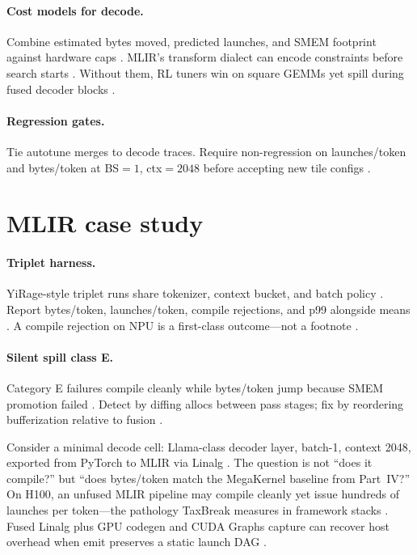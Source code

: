 \paragraph{Cost models for decode.} Combine estimated bytes moved, predicted launches, and SMEM footprint against hardware caps \citep{memoryfloor2026,taxbreak2026}. MLIR's transform dialect can encode constraints before search starts \citep{chen2020compilerbasedhardw}. Without them, RL tuners win on square GEMMs yet spill during fused decoder blocks \citep{yirage2026}.

\paragraph{Regression gates.} Tie autotune merges to decode traces. Require non-regression on launches/token and bytes/token at BS${=}1$, ctx${=}2048$ before accepting new tile configs \citep{taxbreak2026,memoryfloor2026,nvidia2024cudagraphs}.

\section{MLIR case study}
\label{sec:ch14_mlir_case_study}

\paragraph{Triplet harness.} YiRage-style triplet runs share tokenizer, context bucket, and batch policy \citep{yirage2026,patel2025llminference}. Report bytes/token, launches/token, compile rejections, and p99 alongside means \citep{memoryfloor2026,taxbreak2026}. A compile rejection on NPU is a first-class outcome---not a footnote \citep{amd2024xdna,amd2024aie}.

\paragraph{Silent spill class E.} Category E failures compile cleanly while bytes/token jump because SMEM promotion failed \citep{memoryfloor2026,dao2022flashattention}. Detect by diffing allocs between pass stages; fix by reordering bufferization relative to fusion \citep{yirage2026,chen2020compilerbasedhardw,taxbreak2026}.

Consider a minimal decode cell: Llama-class decoder layer, batch-1, context 2048, exported from PyTorch to MLIR via Linalg \citep{patel2025llminference}. The question is not ``does it compile?'' but ``does bytes/token match the MegaKernel baseline from Part~IV?'' On H100, an unfused MLIR pipeline may compile cleanly yet issue hundreds of launches per token---the pathology TaxBreak measures in framework stacks \citep{taxbreak2026}. Fused Linalg plus GPU codegen and CUDA Graphs capture can recover host overhead when emit preserves a static launch DAG \citep{nvidia2024cudagraphs,memoryfloor2026}.

